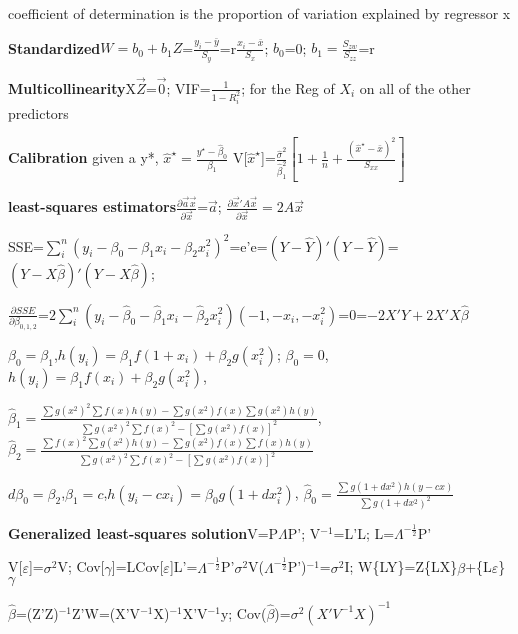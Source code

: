 \documentclass[
  10pt,
  twocolumn]{article}
\begin{document}
coefficient of determination is the proportion of variation explained by
regressor x

\dotfill

\textbf{Standardized}\(W=b_0+b_1Z\)=\(\frac{y_i-\bar y}{S_y}\)=r\(\frac{x_i-\bar x}{S_x}\);
\(b_0\)=0; \(b_1=\frac{S_{zw}}{S_{zz}}\)=r

\dotfill

\textbf{Multicollinearity}X\(\vec Z\)=\(\vec 0\);
VIF=\(\frac1{1-R^2_i}\); for the Reg of \(X_i\) on all of the other
predictors\dotfill

\textbf{Calibration} given a y*,
\(\hat x^\star=\frac{y^\star-\hat\beta_0}{\beta_1}\)
V{[}\(\hat x^\star\){]}=\(\frac{\hat\sigma^2}{\hat\beta_1^2}[1+\frac1n+\frac{(\hat x^\star-\bar x)^2}{S_{xx}}]\)

\textbf{least-squares estimators}\(\frac{\partial\vec a\vec x}{\partial\vec x}\)=\(\vec a\);
\(\frac{\partial\vec x'A\vec x}{\partial\vec x}=2A\vec x\)\dotfill

SSE=\(\sum_{i}^n(y_i-\beta_0-\beta_1x_i-\beta_2x_i^2)^2\)=e'e=\((Y-\hat Y)'(Y-\hat Y)\)=\((Y-X\hat\beta)'(Y-X\hat\beta)\);

\(\frac{\partial SSE}{\partial\beta_{0,1,2}}\)=\(2\sum_{i}^n(y_i-\hat\beta_0-\hat\beta_1x_i-\hat\beta_2x_i^2)(-1,-x_i,-x_i^2)\)=0=\(-2X'Y+2X'X\hat\beta\)

\(\beta_0=\beta_1\),\(h(y_i)=\beta_1f(1+x_i)+\beta_2g(x_i^2)\);
\(\beta_0=0\),\(h(y_i)=\beta_1f(x_i)+\beta_2g(x_i^2)\),

\(\hat\beta_1=\frac{\sum g(x^2)^2\sum f(x)h(y)-\sum g(x^2)f(x)\sum g(x^2)h(y)}{\sum g(x^2)^2\sum f(x)^2-[\sum g(x^2)f(x)]^2}\),
\(\hat\beta_2=\frac{\sum f(x)^2\sum g(x^2)h(y)-\sum g(x^2)f(x)\sum f(x)h(y)}{\sum g(x^2)^2\sum f(x)^2-[\sum g(x^2)f(x)]^2}\)

\(d\beta_0=\beta_2\),\(\beta_1=c\),\(h(y_i-cx_i)=\beta_0g(1+dx_i^2)\),
\(\hat\beta_0=\frac{\sum g(1+dx^2)h(y-cx)}{\sum g(1+dx^2)^2}\)

\textbf{Generalized least-squares solution}V=P\(\Lambda\)P';
V\(^{-1}\)=L'L; L=\(\Lambda^{-\frac12}\)P'\dotfill

V{[}\(\varepsilon\){]}=\(\sigma^2\)V;
Cov{[}\(\gamma\){]}=LCov{[}\(\varepsilon\){]}L'=\(\Lambda^{-\frac12}\)P'\(\sigma^2\)V(\(\Lambda^{-\frac12}\)P')\(^{-1}\)=\(\sigma^2\)I;
W\{LY\}=Z\{LX\}\(\beta\)+\{L\(\varepsilon\)\}\(\gamma\)

\(\hat\beta\)=(Z'Z)\(^{-1}\)Z'W=(X'V\(^{-1}\)X)\(^{-1}\)X'V\(^{-1}\)y;
Cov(\(\hat\beta\))=\(\sigma^2(X'V^{-1}X)^{-1}\)

\dotfill
\end{document}
